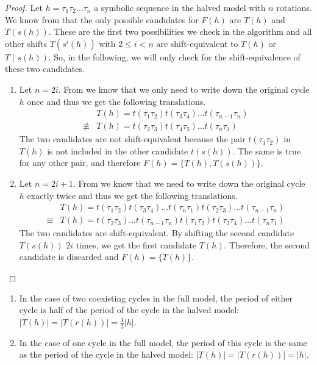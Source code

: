 \begin{proof}
	Let $h = \tau_1\tau_2 \dots \tau_n$ a symbolic sequence in the halved model with $n$ rotations.
	We know from  that the only possible candidates for $F(h)$ are $T(h)$ and $T(s(h))$.
	These are the first two possibilities we check in the algorithm and all other shifts $T(s^i(h))$ with $2 \leq i < n$ are shift-equivalent to $T(h)$ or $T(s(h))$.
	So, in the following, we will only check for the shift-equivalence of these two candidates.
	\begin{enumerate}
		\item Let $n = 2i$.
		      From  we know that we only need to write down the original cycle $h$ once and thus we get the following translations.
		      \begin{align*}
			              & T(h) = t(\tau_1\tau_2) t(\tau_3\tau_4) \dots t(\tau_{n-1}\tau_n) \\
			      \nequiv & T(h) = t(\tau_2\tau_3) t(\tau_4\tau_5) \dots t(\tau_n\tau_1)
		      \end{align*}
		      The two candidates are not shift-equivalent because the pair $t(\tau_1\tau_2)$ in $T(h)$ is not included in the other candidate $t(s(h))$.
		      The same is true for any other pair, and therefore $F(h) = \{T(h), T(s(h))\}$.
		\item Let $n = 2i + 1$.
		      From  we know that we need to write down the original cycle $h$ exactly twice and thus we get the following translations.
		      \begin{align*}
			             & T(h) = t(\tau_1\tau_2) t(\tau_3\tau_4) \dots t(\tau_n\tau_1) t(\tau_2\tau_3) \dots t(\tau_{n-1}\tau_n) \\
			      \equiv & T(h) = t(\tau_2\tau_3) \dots t(\tau_{n-1}\tau_n) t(\tau_1\tau_2) t(\tau_3\tau_4) \dots t(\tau_n\tau_1)
		      \end{align*}
		      The two candidates are shift-equivalent.
		      By shifting the second candidate $T(s(h))$ $2i$ times, we get the first candidate $T(h)$.
		      Therefore, the second candidate is discarded and $F(h) = \{T(h)\}$.
	\end{enumerate}
\end{proof}


\begin{theorem}
	\begin{enumerate}
		\item In the case of two coexisting cycles in the full model, the period of either cycle is half of the period of the cycle in the halved model: $|T(h)| = |T(r(h))| = \frac{1}{2} |h|$.
		\item In the case of one cycle in the full model, the period of this cycle is the same as the period of the cycle in the halved model: $|T(h)| = |T(r(h))| = |h|$.
	\end{enumerate}
\end{theorem}


